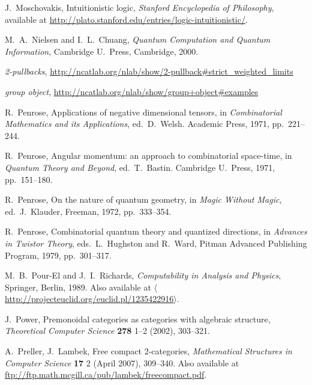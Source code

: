 \documentclass[12pt,twoside,openright]{report}
\begin{document}
\begin{thebibliography}{99}
 J.\ Moschovakis, Intuitionistic logic,
{\sl Stanford Encyclopedia of Philosophy}, available at \hfill \break
\href{http://plato.stanford.edu/entries/logic-intuitionistic/}
{http://plato.stanford.edu/entries/logic-intuitionistic/}.

 M.\ A.\ Nielsen and I.\ L.\ Chuang,
{\sl Quantum Computation and Quantum Information}, Cambridge U.\ 
Press, Cambridge, 2000.

 {\sl 2-pullbacks}, 
\href{http://ncatlab.org/nlab/show/2-pullback#strict_weighted_limits}
{http://ncatlab.org/nlab/show/2-pullback\#strict\_weighted\_limits}

 {\sl group object}, 
\href{http://ncatlab.org/nlab/show/group+object#examples}
{http://ncatlab.org/nlab/show/group+object\#examples}
 
R.\ Penrose, Applications of negative dimensional tensors, in \textsl{Combinatorial Mathematics and its Applications}, ed.\
D.~Welsh. Academic Press, 1971, pp.\ 221--244.

R.\ Penrose, Angular momentum: an approach to combinatorial space-time, in \textsl{Quantum Theory and Beyond}, ed.\
T.~Bastin. Cambridge U.\ Press, 1971, pp.\ 151--180.

R.\ Penrose, On the nature of quantum geometry, in \textsl{Magic Without Magic}, ed.\ J.\ Klauder, Freeman, 1972, pp.\ 333--354.

R.\ Penrose, Combinatorial quantum theory and quantized directions, in \textsl{Advances in Twistor Theory}, eds.\ L.\ Hughston and R.\ Ward, Pitman Advanced Publishing Program, 1979, pp.\ 301--317.

 M.\ B.\ Pour-El and J.\ I.\ Richards,
\textsl{Computability in Analysis and Physics}, Springer, Berlin, 1989. Also available at \href{http://projecteuclid.org/euclid.pl/1235422916}
{$\langle$http://projecteuclid.org/euclid.pl/1235422916$\rangle$}.

\bibitem{PowerTCS} J.\ Power, Premonoidal categories as categories with algebraic structure, \textsl{Theoretical Computer Science} \textbf{278} 1--2 (2002), 303--321.

 A.\ Preller, J.\ Lambek, Free compact 2-categories, \textsl{Mathematical Structures in Computer Science} \textbf{17} 2 (April 2007), 309--340.  Also available at \href{ftp://ftp.math.mcgill.ca/pub/lambek/freecompact.pdf}{ftp://ftp.math.mcgill.ca/pub/lambek/freecompact.pdf}.


\end{thebibliography}
\end{document}
